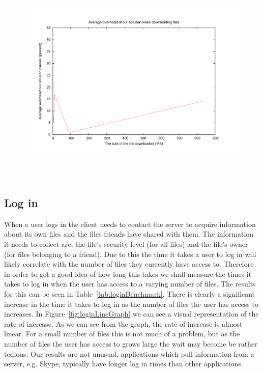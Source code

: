 \documentclass[12pt, titlepage]{article}
\begin{document}
\begin{figure}[H]
\centerline{\includegraphics[height=4.0in,width=7in,angle=0]{plots/downloadOverhead/downloadOverhead.pdf}}
\caption{}
\label{fig:downloadOverheadLineGraph}
\end{figure}

\subsection{Log in}
When a user logs in the client needs to contact the server to acquire information about its own files and the files friends have shared with them. The information it needs to collect are, the file's security level (for all files) and the file's owner (for files belonging to a friend). Due to this the time it takes a user to log in will likely correlate with the number of files they currently have access to. Therefore in order to get a good idea of how long this takes we shall measure the times it takes to log in when the user has access to a varying number of files. The results for this can be seen in Table~\ref{tab:loginBenchmark}.
\newline \indent There is clearly a significant increase in the time it takes to log in as the number of files the user has access to increases. In Figure~\ref{fig:loginLineGraph} we can see a visual representation of the rate of increase. As we can see from the graph, the rate of increase is almost linear. For a small number of files this is not much of a problem, but as the number of files the user has access to grows large the wait may become be rather tedious.
\newline \indent Our results are not unusual; applications which pull information from a server, e.g. Skype, typically have longer log in times than other applications.
\end{document}
